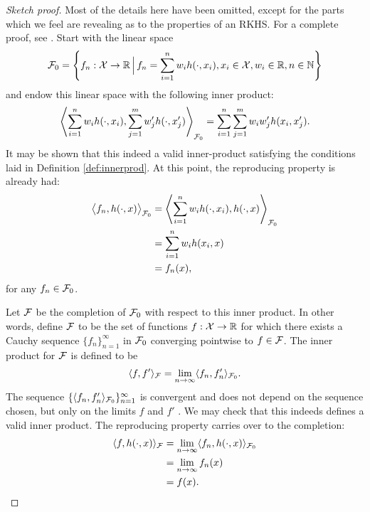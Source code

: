 \begin{proof}[Sketch proof]
  Most of the details here have been omitted, except for the parts which we feel are revealing as to the properties of an RKHS.
  For a complete proof, see \citet{berlinet2011reproducing}. 
  Start with the linear space
  \[
    {\mathcal F}_0 = \left\{ f_n:{\mathcal X}\to\mathbb{R} \, \Big| \, f_n = \sum_{i=1}^n w_i h(\cdot,x_i), x_i\in{\mathcal X}, w_i\in\mathbb{R}, n\in\mathbb{N} \right\}
  \]
  and endow this linear space with the following inner product:
  \[\label{eq:rkhsinnerprod}
    \left\langle \sum_{i=1}^n w_i h(\cdot,x_i), \sum_{j=1}^m w_j' h(\cdot,x_j') \right\rangle_{{\mathcal F}_0} = \sum_{i=1}^n\sum_{j=1}^m w_i w_j' h(x_i,x_j').
  \]
  It may be shown that this indeed a valid inner-product satisfying the conditions laid in Definition \ref{def:innerprod}.
  At this point, the reproducing property is already had:
  \begin{align*}
    \big\langle f_n, h(\cdot,x) \big\rangle_{{\mathcal F}_0} 
    &= \left\langle \sum_{i=1}^n w_i h(\cdot,x_i), h(\cdot,x) \right\rangle_{{\mathcal F}_0} \\
    &= \sum_{i=1}^n w_i h(x_i,x) \\
    &= f_n(x),
  \end{align*}
  for any $f_n\in{\mathcal F}_0$.
  
  Let ${\mathcal F}$ be the completion of ${\mathcal F}_0$ with respect to this inner product.
  In other words, define ${\mathcal F}$ to be the set of functions $f:{\mathcal X}\to\mathbb{R}$ for which there exists a Cauchy sequence $\{f_n\}_{n=1}^\infty$ in ${\mathcal F}_0$ converging pointwise to $f \in {\mathcal F}$.
  The inner product for ${\mathcal F}$ is defined to be
  \[
    \langle f,f'\rangle_{\mathcal F} = \lim_{n\to\infty} \langle f_n,f_n'\rangle_{{\mathcal F}_0}.
  \]
  The sequence $\{ \langle f_n,f_n'\rangle_{{\mathcal F}_0} \}_{n=1}^\infty$ is convergent and does not depend on the sequence chosen, but only on the limits $f$ and $f'$ \citep[Lemma 5]{berlinet2011reproducing}.
  We may check that this indeeds defines a valid inner product.
  The reproducing property carries over to the completion:
  \begin{align*}
    \langle f,h(\cdot,x)\rangle_{\mathcal F} 
    &= \lim_{n\to\infty} \langle f_n,h(\cdot,x)\rangle_{{\mathcal F}_0} \\
    &= \lim_{n\to\infty} f_n(x) \\
    &= f(x).
  \end{align*}
  

\end{proof}
